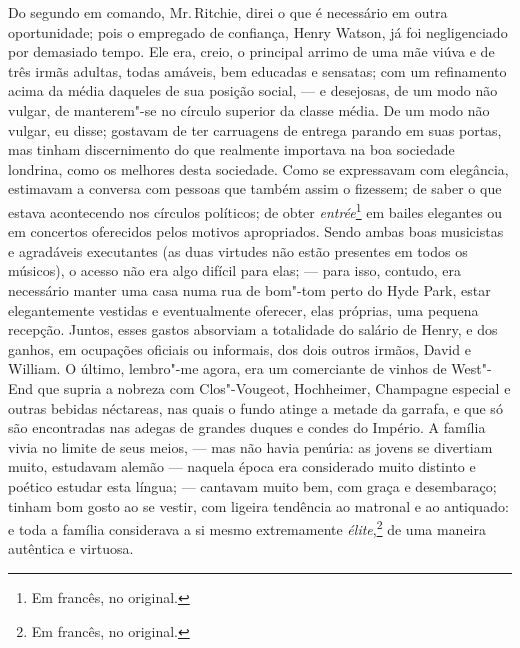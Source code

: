 Do segundo em comando, Mr.\,Ritchie, direi o que é necessário em
outra oportunidade; pois o empregado de confiança, Henry Watson, já foi
negligenciado por demasiado tempo. Ele era, creio, o principal arrimo de
uma mãe viúva e de três irmãs adultas, todas amáveis, bem educadas e
sensatas; com um refinamento acima da média daqueles de sua posição
social, --- e desejosas, de um modo não vulgar, de manterem"-se no círculo
superior da classe média. De um modo não vulgar, eu disse; gostavam de
ter carruagens de entrega parando em suas portas, mas tinham
discernimento do que realmente importava na boa sociedade londrina, como
os melhores desta sociedade. Como se expressavam com elegância,
estimavam a conversa com pessoas que também assim o fizessem; de saber o
que estava acontecendo nos círculos políticos; de obter
\textit{entrée}\footnote{Em francês, no original.} em bailes
elegantes ou em concertos oferecidos pelos motivos apropriados. Sendo
ambas boas musicistas e agradáveis executantes (as duas virtudes não
estão presentes em todos os músicos), o acesso não era algo difícil para
elas; --- para isso, contudo, era necessário manter uma casa numa rua de
bom"-tom perto do Hyde Park, estar elegantemente vestidas e eventualmente
oferecer, elas próprias, uma pequena recepção. Juntos, esses gastos
absorviam a totalidade do salário de Henry, e dos ganhos, em ocupações
oficiais ou informais, dos dois outros irmãos, David e William. O
último, lembro"-me agora, era um comerciante de vinhos de West"-End que
supria a nobreza com Clos"-Vougeot, Hochheimer, Champagne especial e
outras bebidas néctareas, nas quais o fundo atinge a metade da garrafa,
e que só são encontradas nas adegas de grandes duques e condes do
Império. A família vivia no limite de seus meios, --- mas não havia
penúria: as jovens se divertiam muito, estudavam alemão --- naquela época
era considerado muito distinto e poético estudar esta língua; ---
cantavam muito bem, com graça e desembaraço; tinham bom gosto ao se
vestir, com ligeira tendência ao matronal e ao antiquado: e toda a
família considerava a si mesmo extremamente \textit{élite},\footnote{Em
  francês, no original.} de uma maneira autêntica e
virtuosa.

